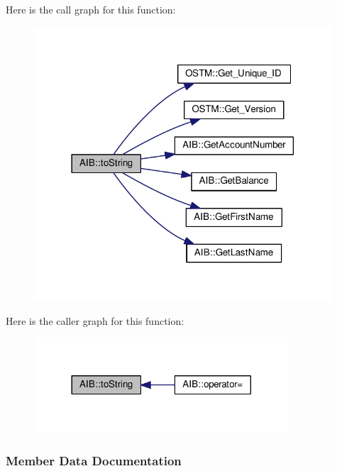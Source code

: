 Here is the call graph for this function\+:\nopagebreak
\begin{figure}[H]
\begin{center}
\leavevmode
\includegraphics[width=314pt]{class_a_i_b_aff0f0a0db75a17efec4bd500b888232d_aff0f0a0db75a17efec4bd500b888232d_cgraph}
\end{center}
\end{figure}




Here is the caller graph for this function\+:\nopagebreak
\begin{figure}[H]
\begin{center}
\leavevmode
\includegraphics[width=269pt]{class_a_i_b_aff0f0a0db75a17efec4bd500b888232d_aff0f0a0db75a17efec4bd500b888232d_icgraph}
\end{center}
\end{figure}




\subsubsection{Member Data Documentation}
